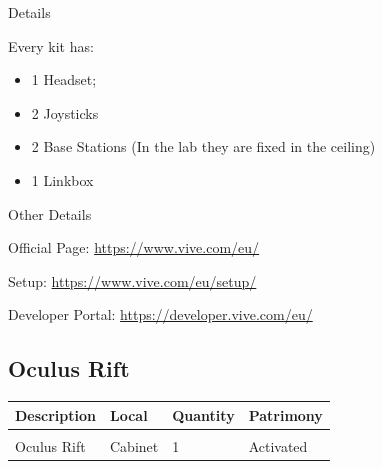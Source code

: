 {\Large Details}
\vspace{1em}

Every kit has: 
\begin{itemize}
    \item 1 Headset;
    \item 2 Joysticks
    \item 2 Base Stations (In the lab they are fixed in the ceiling)
    \item 1 Linkbox
\end{itemize}

\vspace{1em}
{\Large Other Details}
\vspace{1em}

Official Page: \url{https://www.vive.com/eu/}

Setup: \url{https://www.vive.com/eu/setup/}

Developer Portal: \url{https://developer.vive.com/eu/}
\newpage

\subsection{Oculus Rift}
\begin{tabularx}{\textwidth}{ Y  Y  Y  Y }
    \textbf{Description} &  \textbf{Local} &  \textbf{Quantity} & \textbf{Patrimony}\\
    \hline \\
    Oculus Rift & Cabinet & 1 & Activated
\end{tabularx}
\vspace{1cm}

